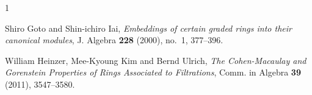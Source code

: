 \documentclass[12pt]{amsart}
\theoremstyle{definition}
\theoremstyle{remark}
\numberwithin{equation}{section}
\renewcommand{\:}{\colon}
\begin{document}
\begin{thebibliography}{1}

  

 

  

Shiro Goto and Shin-ichiro Iai, \emph{Embeddings of certain graded 
rings into their canonical modules}, J. Algebra \textbf{228} (2000),
 no.~1, 377--396.






William Heinzer, Mee-Kyoung Kim and Bernd Ulrich,  
\emph{The Cohen-Macaulay and Gorenstein Properties of Rings Associated to Filtrations}, 
Comm. in Algebra \textbf{39} (2011), 3547--3580. 




\end{thebibliography}
\end{document}
